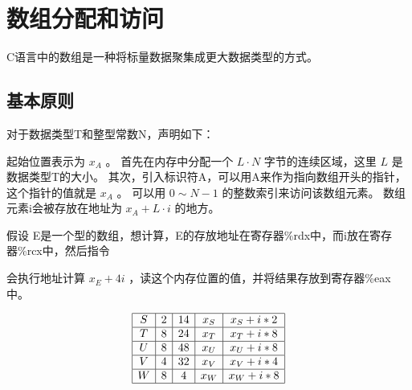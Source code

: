 
\section{数组分配和访问}
{
    C语言中的数组是一种将标量数据聚集成更大数据类型的方式。

    \subsection{基本原则}
    {
        对于数据类型T和整型常数N，声明如下：


        起始位置表示为 $x_A$ 。
        首先在内存中分配一个 $L \cdot N$ 字节的连续区域，这里 $L$ 是数据类型T的大小。
        其次，引入标识符A，可以用A来作为指向数组开头的指针，这个指针的值就是 $x_A$ 。
        可以用 $0 \sim N - 1$ 的整数索引来访问该数组元素。
        数组元素i会被存放在地址为 $x_A + L \cdot i$ 的地方。

        假设 E是一个型的数组，想计算，E的存放地址在寄存器\%rdx中，而i放在寄存器\%rcx中，然后指令


        会执行地址计算 $x_E + 4i$ ，读这个内存位置的值，并将结果存放到寄存器\%eax中。

        \begin{practicec}
            \begin{table}[htb]
                \centering

                \[
                    \begin{array}{|c|c|c|c|c|}
                        \hline
                        S & 2 & 14 & x_S & x_S + i * 2 \\
                        \hline
                        T & 8 & 24 & x_T & x_T + i * 8 \\
                        \hline
                        U & 8 & 48 & x_U & x_U + i * 8 \\
                        \hline
                        V & 4 & 32 & x_V & x_V + i * 4 \\
                        \hline
                        W & 8 & 4 & x_W & x_W + i * 8 \\
                        \hline
                    \end{array}
                \]
            \end{table}
        \end{practicec}
    }

}
